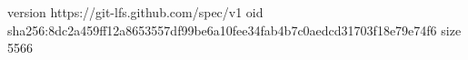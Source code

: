version https://git-lfs.github.com/spec/v1
oid sha256:8dc2a459ff12a8653557df99be6a10fee34fab4b7c0aedcd31703f18e79e74f6
size 5566
